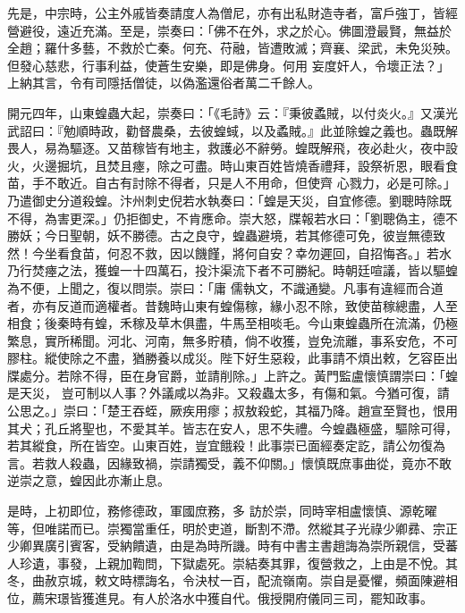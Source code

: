 \begin{pinyinscope}
 先是，中宗時，公主外戚皆奏請度人為僧尼，亦有出私財造寺者，富戶強丁，皆經營避役，遠近充滿。至是，崇奏曰：「佛不在外，求之於心。佛圖澄最賢，無益於全趙；羅什多藝，不救於亡秦。何充、苻融，皆遭敗滅；齊襄、梁武，未免災殃。但發心慈悲，行事利益，使蒼生安樂，即是佛身。何用
 妄度奸人，令壞正法？」上納其言，令有司隱括僧徒，以偽濫還俗者萬二千餘人。



 開元四年，山東蝗蟲大起，崇奏曰：「《毛詩》云：『秉彼蟊賊，以付炎火。』又漢光武詔曰：『勉順時政，勸督農桑，去彼蝗蜮，以及蟊賊。』此並除蝗之義也。蟲既解畏人，易為驅逐。又苗稼皆有地主，救護必不辭勞。蝗既解飛，夜必赴火，夜中設火，火邊掘坑，且焚且瘞，除之可盡。時山東百姓皆燒香禮拜，設祭祈恩，眼看食苗，手不敢近。自古有討除不得者，只是人不用命，但使齊
 心戮力，必是可除。」乃遣御史分道殺蝗。汴州刺史倪若水執奏曰：「蝗是天災，自宜修德。劉聰時除既不得，為害更深。」仍拒御史，不肯應命。崇大怒，牒報若水曰：「劉聰偽主，德不勝妖；今日聖朝，妖不勝德。古之良守，蝗蟲避境，若其修德可免，彼豈無德致然！今坐看食苗，何忍不救，因以饑饉，將何自安？幸勿遲回，自招悔吝。」若水乃行焚瘞之法，獲蝗一十四萬石，投汴渠流下者不可勝紀。時朝廷喧議，皆以驅蝗為不便，上聞之，復以問崇。崇曰：「庸
 儒執文，不識通變。凡事有違經而合道者，亦有反道而適權者。昔魏時山東有蝗傷稼，緣小忍不除，致使苗稼總盡，人至相食；後秦時有蝗，禾稼及草木俱盡，牛馬至相啖毛。今山東蝗蟲所在流滿，仍極繁息，實所稀聞。河北、河南，無多貯積，倘不收獲，豈免流離，事系安危，不可膠柱。縱使除之不盡，猶勝養以成災。陛下好生惡殺，此事請不煩出敕，乞容臣出牒處分。若除不得，臣在身官爵，並請削除。」上許之。黃門監盧懷慎謂崇曰：「蝗是天災，
 豈可制以人事？外議咸以為非。又殺蟲太多，有傷和氣。今猶可復，請公思之。」崇曰：「楚王吞蛭，厥疾用瘳；叔敖殺蛇，其福乃降。趙宣至賢也，恨用其犬；孔丘將聖也，不愛其羊。皆志在安人，思不失禮。今蝗蟲極盛，驅除可得，若其縱食，所在皆空。山東百姓，豈宜餓殺！此事崇已面經奏定訖，請公勿復為言。若救人殺蟲，因緣致禍，崇請獨受，義不仰關。」懷慎既庶事曲從，竟亦不敢逆崇之意，蝗因此亦漸止息。



 是時，上初即位，務修德政，軍國庶務，多
 訪於崇，同時宰相盧懷慎、源乾曜等，但唯諾而已。崇獨當重任，明於吏道，斷割不滯。然縱其子光祿少卿彞、宗正少卿異廣引賓客，受納饋遺，由是為時所譏。時有中書主書趙誨為崇所親信，受蕃人珍遺，事發，上親加鞫問，下獄處死。崇結奏其罪，復營救之，上由是不悅。其冬，曲赦京城，敕文時標誨名，令決杖一百，配流嶺南。崇自是憂懼，頻面陳避相位，薦宋璟皆獲進見。有人於洛水中獲自代。俄授開府儀同三司，罷知政事。




\end{pinyinscope}
